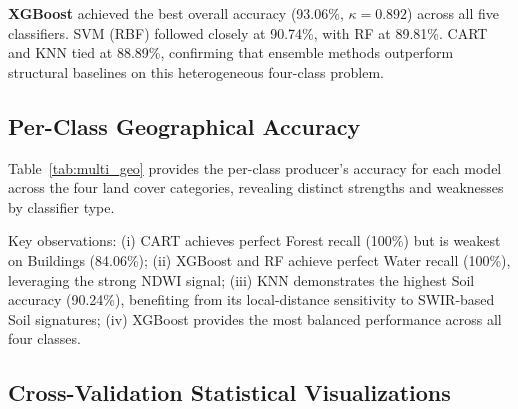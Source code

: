 \documentclass[12pt, a4paper, twocolumn]{article}
\begin{document}
\textbf{XGBoost} achieved the best overall accuracy (93.06\%, $\kappa=0.892$) across all five classifiers.
SVM (RBF) followed closely at 90.74\%, with RF at 89.81\%.
CART and KNN tied at 88.89\%, confirming that ensemble methods outperform structural baselines on this heterogeneous four-class problem.

\subsection{Per-Class Geographical Accuracy}

Table~\ref{tab:multi_geo} provides the per-class producer's accuracy for each model across the four land cover categories, revealing distinct strengths and weaknesses by classifier type.

\begin{table}[H]
\centering
\caption{Per-class producer accuracy (\%) for all 5 classifiers.}
\label{tab:multi_geo}
\end{table}

Key observations: (i) CART achieves perfect Forest recall (100\%) but is weakest on Buildings (84.06\%);
(ii) XGBoost and RF achieve perfect Water recall (100\%), leveraging the strong NDWI signal;
(iii) KNN demonstrates the highest Soil accuracy (90.24\%), benefiting from its local-distance sensitivity to SWIR-based Soil signatures;
(iv) XGBoost provides the most balanced performance across all four classes.

\subsection{Cross-Validation Statistical Visualizations}
\end{document}
